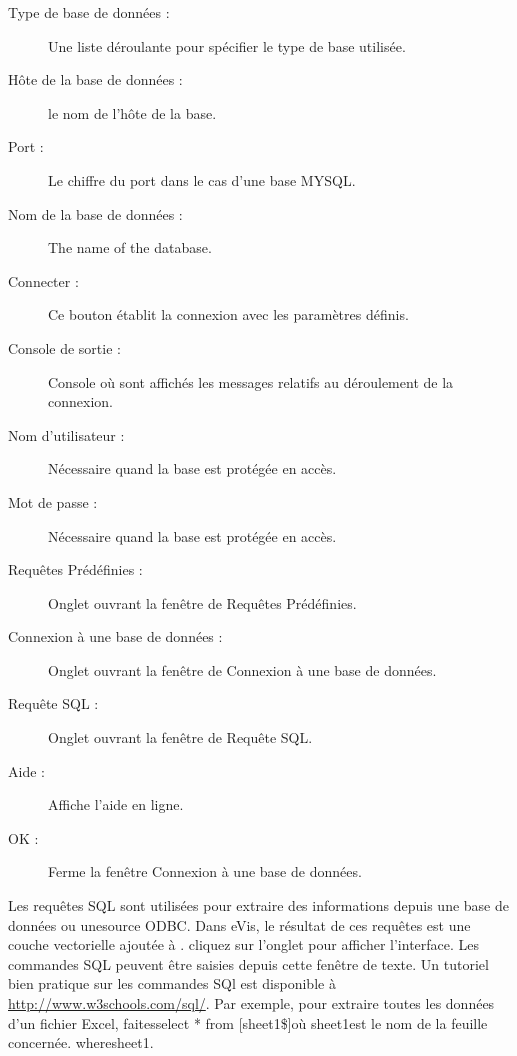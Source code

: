 \begin{description}
\item[Type de base de données :] Une liste déroulante pour spécifier le type de base utilisée.
\item[Hôte de la base de données :] le nom de l'hôte de la base.
\item[Port :] Le chiffre du port dans le cas d'une base \og MYSQL\fg .
\item[Nom de la base de données :] The name of the database.
\item[Connecter :] Ce bouton établit la connexion avec les paramètres définis.
\item[Console de sortie :] Console où sont affichés les messages relatifs au déroulement de la connexion.
\item[Nom d'utilisateur :] Nécessaire quand la base est protégée en accès.
\item[Mot de passe :] Nécessaire quand la base est protégée en accès.
\item[Requêtes Prédéfinies :]  Onglet ouvrant la fenêtre de \og Requêtes Prédéfinies\fg .
\item[Connexion à une base de données :] Onglet ouvrant la fenêtre de \og Connexion à une base de données\fg .
\item[Requête SQL :] Onglet ouvrant la fenêtre de \og Requête SQL\fg .
\item[Aide :] Affiche l'aide en ligne.
\item[OK :] Ferme la fenêtre \og Connexion à une base de données\fg .
\end{description}

\label{evis_running_sql}


Les requêtes SQL sont utilisées pour extraire des informations depuis une base de données ou unesource ODBC. Dans eVis, le résultat de ces requêtes est une couche vectorielle ajoutée à \qg. cliquez sur l'onglet  pour afficher l'interface. Les commandes SQL peuvent être saisies depuis cette fenêtre de texte. Un tutoriel bien pratique sur les commandes SQl est disponible à \url{http://www.w3schools.com/sql/}. Par exemple, pour extraire toutes les données d'un fichier Excel, faites\og select * from [sheet1\$]\fg  où \og sheet1\fg  est le nom de la feuille concernée.
where\og sheet1\fg .

